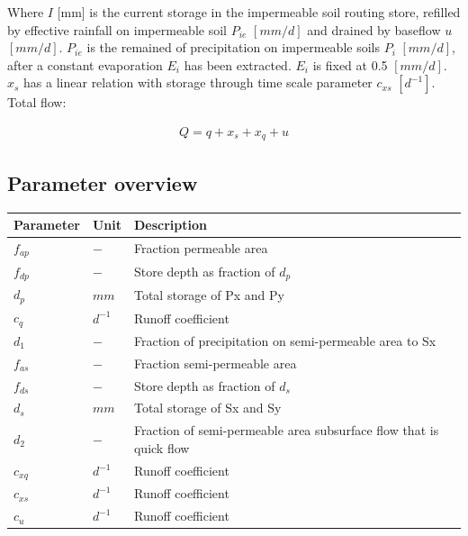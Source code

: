 Where $I$ [mm] is the current storage in the impermeable soil routing store, refilled by effective rainfall on impermeable soil $P_{ie}$ $[mm/d]$ and drained by baseflow $u$ $[mm/d]$.
$P_{ie}$ is the remained of precipitation on impermeable soils $P_i$ $[mm/d]$, after a constant evaporation $E_i$ has been extracted.
$E_i$ is fixed at 0.5 $[mm/d]$.
$x_s$ has a linear relation with storage through time scale parameter $c_{xs}$ $[d^{-1}]$.
Total flow:

\begin{align}
	Q = q+x_s+x_q+u
\end{align}

\subsection{Parameter overview}
\begin{table}[htbp]
  \centering
    \begin{tabular}{lll}
    \toprule
    Parameter & Unit  & Description \\
    \midrule
    $f_{ap}$ & $-$   & Fraction permeable area \\
    $f_{dp}$ & $-$   & Store depth as fraction of $d_p$ \\
    $d_p$ & $mm$  & Total storage of Px and Py \\
    $c_q$ & $d^{-1}$ & Runoff coefficient \\
    $d_1$ & $-$   & Fraction of precipitation on semi-permeable area to Sx \\
    $f_{as}$ & $-$   & Fraction semi-permeable area \\
    $f_{ds}$ & $-$   & Store depth as fraction of $d_s$ \\
    $d_s$ & $mm$  & Total storage of Sx and Sy \\
    $d_2$ & $-$   & Fraction of semi-permeable area subsurface flow that is quick flow \\
    $c_{xq}$ & $d^{-1}$ & Runoff coefficient \\
    $c_{xs}$ & $d^{-1}$ & Runoff coefficient \\
    $c_{u}$ & $d^{-1}$ & Runoff coefficient \\
    \bottomrule
    \end{tabular}%
  \label{tab:addlabel}%
\end{table}%

